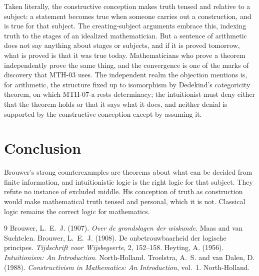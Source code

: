 \documentclass{situationist-preprint}
\begin{document}
\begin{reply}
Taken literally, the constructive conception makes truth tensed and relative to a subject: a statement becomes true when someone carries out a construction, and is true for that subject. The creating-subject arguments embrace this, indexing truth to the stages of an idealized mathematician. But a sentence of arithmetic does not say anything about stages or subjects, and if it is proved tomorrow, what is proved is that it was true today. Mathematicians who prove a theorem independently prove the same thing, and the convergence is one of the marks of discovery that MTH-03 uses. The independent realm the objection mentions is, for arithmetic, the structure fixed up to isomorphism by Dedekind's categoricity theorem, on which MTH-07-a rests determinacy; the intuitionist must deny either that the theorem holds or that it says what it does, and neither denial is supported by the constructive conception except by assuming it.
\end{reply}

\section{Conclusion}

Brouwer's strong counterexamples are theorems about what can be decided from finite information, and intuitionistic logic is the right logic for that subject. They refute no instance of excluded middle. His conception of truth as construction would make mathematical truth tensed and personal, which it is not. Classical logic remains the correct logic for mathematics.

\begin{thebibliography}{9}\small
{} Brouwer, L.~E.~J. (1907). \emph{Over de grondslagen der wiskunde}. Maas and van Suchtelen.
 Brouwer, L.~E.~J. (1908). De onbetrouwbaarheid der logische principes. \emph{Tijdschrift voor Wijsbegeerte}, 2, 152--158.
 Heyting, A. (1956). \emph{Intuitionism: An Introduction}. North-Holland.
 Troelstra, A.~S. and van Dalen, D. (1988). \emph{Constructivism in Mathematics: An Introduction}, vol.~1. North-Holland.
\end{thebibliography}
\end{document}
